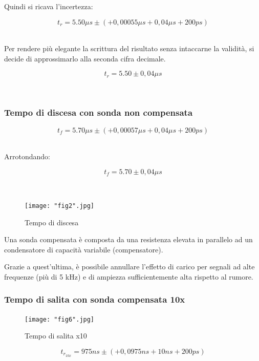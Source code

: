 \documentclass[a4paper]{article}
\begin{document}
Quindi si ricava l'incertezza:
\begin{Large}
	\begin{equation}
  		{t_r}= 5.50\mu s\pm (+ 0,00055\mu s + 0,04\mu s + 200ps)
	\end{equation}
\end{Large}\\
Per rendere più elegante la scrittura del risultato senza intaccarne la validità, si decide di approssimarlo alla seconda cifra decimale.
\begin{Large}
	\begin{equation}
  		{t_r}= 5.50\pm 0,04 \mu s
	\end{equation}
\end{Large}\\


\subsubsection{Tempo di discesa con sonda non compensata}

\begin{Large}
	\begin{equation}
  		{t_f}= 5.70\mu s\pm (+ 0,00057\mu s + 0,04\mu s + 200ps)
	\end{equation}
\end{Large}\\

Arrotondando: 

\begin{Large}
	\begin{equation}
  		{t_f}= 5.70\pm 0,04 \mu s
	\end{equation}
\end{Large}\\
\begin{figure}[htp]
	\centering
	\texttt{[image: "fig2".jpg]}
	\caption{Tempo di discesa}
	\label{}
\end{figure}

Una sonda compensata è composta da una resistenza elevata in parallelo ad un condensatore di capacità variabile (compensatore).

Grazie a quest'ultima, è possibile annullare l'effetto di carico per segnali ad alte frequenze (più di 5 kHz) e di ampiezza sufficientemente alta rispetto al rumore.

\subsubsection{Tempo di salita con sonda compensata 10x}
\begin{figure}[htp]
	\centering
	\texttt{[image: "fig6".jpg]}
	\caption{Tempo di salita x10}
	\label{}
\end{figure}
\begin{Large}
	\begin{equation}
		{t_{r_{10x}}}= 975ns \pm( + 0,0975ns + 10ns + 200ps)
	\end{equation}
\end{Large}\\
\end{document}
